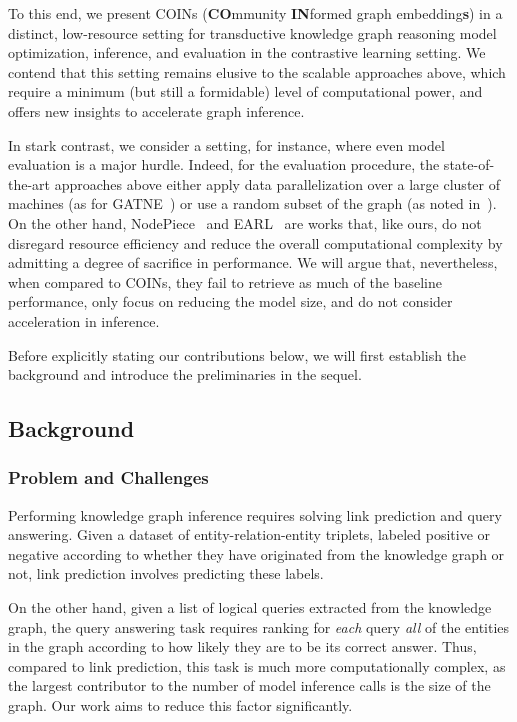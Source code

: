To this end, we present COINs ({\bf CO}mmunity {\bf IN}formed graph embedding{\bf s}) in a distinct, low-resource setting for transductive knowledge graph reasoning model optimization, inference, and evaluation in the contrastive learning setting. We contend that this setting remains elusive to the scalable approaches above, which require a minimum (but still a formidable) level of computational power, and offers new insights to accelerate graph inference. 

In stark contrast, we consider a setting, for instance, where even model evaluation is a major hurdle. Indeed, for the evaluation procedure, the state-of-the-art approaches above either apply data parallelization over a large cluster of machines (as for GATNE~\cite{cen_representation_2019}) or use a random subset of the graph (as noted in~\cite{ren_smore_2021}). On the other hand, NodePiece~\cite{galkin_nodepiece_2022} and EARL~\cite{chen_entity-agnostic_2023} are works that, like ours, do not disregard resource efficiency and reduce the overall computational complexity by admitting a degree of sacrifice in performance. We will argue that, nevertheless, when compared to COINs, they fail to retrieve as much of the baseline performance, only focus on reducing the model size, and do not consider acceleration in inference.

Before explicitly stating our contributions below, we will first establish the background and introduce the preliminaries in the sequel. 

\subsection{Background}
\label{sec:background}
\subsubsection{Problem and Challenges}

Performing knowledge graph inference requires solving link prediction and query answering. Given a dataset of entity-relation-entity triplets, labeled positive or negative according to whether they have originated from the knowledge graph or not, link prediction involves predicting these labels. 

On the other hand, given a list of logical queries extracted from the knowledge graph, the query answering task requires ranking for \emph{each} query \emph{all} of the entities in the graph according to how likely they are to be its correct answer. Thus, compared to link prediction, this task is much more computationally complex, as the largest contributor to the number of model inference calls is the size of the graph. Our work aims to reduce this factor significantly.

